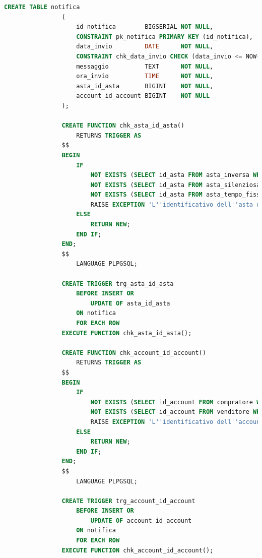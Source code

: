             \begin{lstlisting}[language=SQL, caption=Relazione notifica]
                CREATE TABLE notifica
                (
                    id_notifica        BIGSERIAL NOT NULL,
                    CONSTRAINT pk_notifica PRIMARY KEY (id_notifica),
                    data_invio         DATE      NOT NULL,
                    CONSTRAINT chk_data_invio CHECK (data_invio <= NOW()),
                    messaggio          TEXT      NOT NULL,
                    ora_invio          TIME      NOT NULL,
                    asta_id_asta       BIGINT    NOT NULL,
                    account_id_account BIGINT    NOT NULL
                );
                
                CREATE FUNCTION chk_asta_id_asta()
                    RETURNS TRIGGER AS
                $$
                BEGIN
                    IF
                        NOT EXISTS (SELECT id_asta FROM asta_inversa WHERE id_asta = NEW.asta_id_asta) AND
                        NOT EXISTS (SELECT id_asta FROM asta_silenziosa WHERE id_asta = NEW.asta_id_asta) AND
                        NOT EXISTS (SELECT id_asta FROM asta_tempo_fisso WHERE id_asta = NEW.asta_id_asta) THEN
                        RAISE EXCEPTION 'L''identificativo dell''asta del record inserito non referenzia un''asta esistente';
                    ELSE
                        RETURN NEW;
                    END IF;
                END;
                $$
                    LANGUAGE PLPGSQL;
                
                CREATE TRIGGER trg_asta_id_asta
                    BEFORE INSERT OR
                        UPDATE OF asta_id_asta
                    ON notifica
                    FOR EACH ROW
                EXECUTE FUNCTION chk_asta_id_asta();
                
                CREATE FUNCTION chk_account_id_account()
                    RETURNS TRIGGER AS
                $$
                BEGIN
                    IF
                        NOT EXISTS (SELECT id_account FROM compratore WHERE id_account = NEW.id_account) AND
                        NOT EXISTS (SELECT id_account FROM venditore WHERE id_account = NEW.id_account) THEN
                        RAISE EXCEPTION 'L''identificativo dell''account del record inserito non referenzia un account esistente';
                    ELSE
                        RETURN NEW;
                    END IF;
                END;
                $$
                    LANGUAGE PLPGSQL;
                
                CREATE TRIGGER trg_account_id_account
                    BEFORE INSERT OR
                        UPDATE OF account_id_account
                    ON notifica
                    FOR EACH ROW
                EXECUTE FUNCTION chk_account_id_account();
            \end{lstlisting}
            
